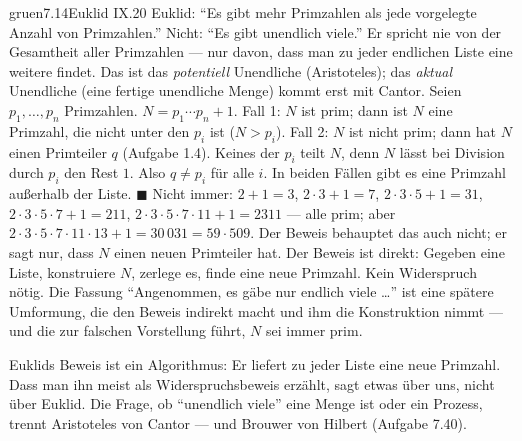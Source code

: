 \begin{loesungkarte}{gruen}{7.14}{Euklid IX.20}
Euklid: \enquote{Es gibt mehr Primzahlen als jede vorgelegte Anzahl von Primzahlen.} Nicht: \enquote{Es gibt unendlich viele.} Er spricht nie von der Gesamtheit aller Primzahlen --- nur davon, dass man zu jeder endlichen Liste eine weitere findet. Das ist das \emph{potentiell} Unendliche (Aristoteles); das \emph{aktual} Unendliche (eine fertige unendliche Menge) kommt erst mit Cantor.
Seien $p_1, \dots, p_n$ Primzahlen. $N = p_1\cdots p_n + 1$. Fall 1: $N$ ist prim; dann ist $N$ eine Primzahl, die nicht unter den $p_i$ ist ($N > p_i$). Fall 2: $N$ ist nicht prim; dann hat $N$ einen Primteiler $q$ (Aufgabe 1.4). Keines der $p_i$ teilt $N$, denn $N$ lässt bei Division durch $p_i$ den Rest $1$. Also $q\neq p_i$ für alle $i$. In beiden Fällen gibt es eine Primzahl außerhalb der Liste. $\blacksquare$
Nicht immer: $2 + 1 = 3$, $2\cdot3 + 1 = 7$, $2\cdot3\cdot5 + 1 = 31$, $2\cdot3\cdot5\cdot7 + 1 = 211$, $2\cdot3\cdot5\cdot7\cdot11 + 1 = 2311$ --- alle prim; aber $2\cdot3\cdot5\cdot7\cdot11\cdot13 + 1 = 30\,031 = 59\cdot509$. Der Beweis behauptet das auch nicht; er sagt nur, dass $N$ einen neuen Primteiler hat.
Der Beweis ist direkt: Gegeben eine Liste, konstruiere $N$, zerlege es, finde eine neue Primzahl. Kein Widerspruch nötig. Die Fassung \enquote{Angenommen, es gäbe nur endlich viele \dots} ist eine spätere Umformung, die den Beweis indirekt macht und ihm die Konstruktion nimmt --- und die zur falschen Vorstellung führt, $N$ sei immer prim.
\begin{mitnehmen}\kastentext
Euklids Beweis ist ein Algorithmus: Er liefert zu jeder Liste eine neue Primzahl. Dass man ihn meist als Widerspruchsbeweis erzählt, sagt etwas über uns, nicht über Euklid. Die Frage, ob \enquote{unendlich viele} eine Menge ist oder ein Prozess, trennt Aristoteles von Cantor --- und Brouwer von Hilbert (Aufgabe 7.40).
\end{mitnehmen}
\end{loesungkarte}

